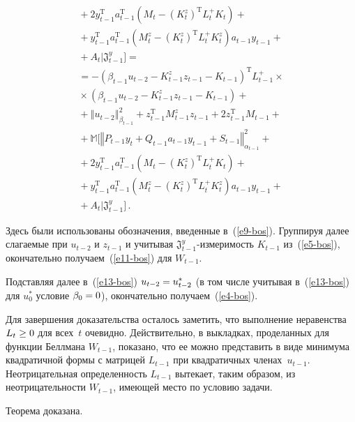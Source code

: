 \begin{multicols}{2}
\begin{multline*}
{}+ 2 y_{t-1}^{\mathrm{T}} a_{t-1}^{\mathrm{T}}
\left(M_t - \left( K_t^z\right)^{\mathrm{T}} L_t^+ K_t \right) +{}\\
{}+
y_{t-1}^{\mathrm{T}} a_{t-1}^{\mathrm{T}} \left(
M_t^z - \left( K_t^z\right)^{\mathrm{T}} L_t^+ K_t^z \right)
a_{t-1} y_{t-1} +{}\\
{}+A_t \Big\vert
\mathfrak{J}_{t-1}^y \Big] ={}\\
{}= -\left( \beta_{t-1} u_{t-2} - K_{t-1}^z z_{t-1} - K_{t-1} \right)^{\mathrm{T}}
L_{t-1}^+\times{}\\
{}\times
\left(\beta_{t-1} u_{t-2} - K_{t-1}^z z_{t-1} - K_{t-1} \right) + {}\\
{}+ \left\Vert u_{t-2}\right\Vert^2_{\beta_{t-1}} +
 z_{t-1}^{\mathrm{T}} M_{t-1}^z z_{t-1} + 2 z_{t-1}^{\mathrm{T}} M_{t-1} +{}\\[9pt]
{}+ \mathbb{M} \Big[
\left\Vert P_{t-1} y_t + Q_{t-1}a_{t-1} y_{t-1} +
S_{t-1} \right\Vert^2_{\alpha_{t-1}} +{}\\
{}+ 2 y_{t-1}^{\mathrm{T}} a_{t-1}^{\mathrm{T}}
\left(M_t - \left( K_t^z\right)^{\mathrm{T}} L_t^+ K_t \right) +{}\\
{}+
y_{t-1}^{\mathrm{T}} a_{t-1}^{\mathrm{T}}
\left(M_t^z - \left( K_t^z\right)^{\mathrm{T}} L_t^+ K_t^z \right)
a_{t-1} y_{t-1} +{}\\
{}+A_t
\Big\vert
\mathfrak{J}_{t-1}^y \Big] \,.
\end{multline*}

\noindent
 Здесь были использованы обозначения, введенные в~(\ref{e9-bos}).
Группируя далее слагаемые при $u_{t-2}$ и $z_{t-1}$ и учитывая
$\mathfrak{J}^y_{t-1}$-из\-ме\-ри\-мость $K_{t-1}$ из~(\ref{e5-bos}),
окончательно получаем~(\ref{e11-bos}) для $W_{t-1}$.

 Подставляя далее в~(\ref{e13-bos}) $u_{t-2}\hm= u_{t-2}^*$ (в том числе
учитывая в~(\ref{e13-bos}) для $u_0^*$ условие $\beta_0\hm=0$), окончательно
получаем~(\ref{e4-bos}).

 Для завершения доказательства осталось заметить, что выполнение
неравенства $L_t\hm\geq0$ для всех~$t$ очевидно. Действительно, в выкладках,
проделанных для функции Беллмана $W_{t-1}$, показано, что ее можно
представить в виде минимума квадратичной формы с матрицей
 $L_{t-1}$ при квадратичных членах~$u_{t-1}$. Неотрицательная
определенность $L_{t-1}$ вытекает, таким образом, из не\-отри\-ца\-тель\-ности
$W_{t-1}$, имеющей место по условию задачи.

 Теорема доказана.


\end{multicols}
